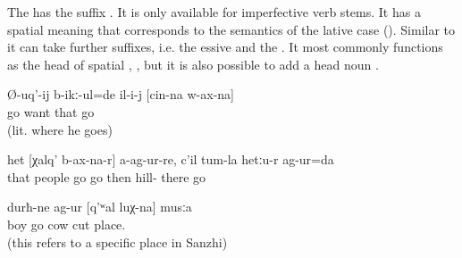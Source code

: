 The  has the suffix . It is only available for imperfective verb stems. It has a spatial meaning that corresponds to the semantics of the lative case (). Similar to  it can take further  suffixes, i.e. the essive and the . It most commonly functions as the head of spatial  , , but it is also possible to add a head noun .
%
\begin{exe}
	\ex	\label{ex:‎He wanted to go his way (where he is going)}
	\gll	Ø-uq'-ij	b-ikː-ul=de	il-i-j	[cin-na	w-ax-na]\\
		go	want	that		go\\
	\glt	{} (lit. where he goes)

	\ex	\label{ex:‎‎I did not go through where the people (normally) go, but through where the hill is}
	\gll	het	[χalq'	b-ax-na-r]	a-ag-ur-re,	c'il	tum-la	hetːu-r	ag-ur=da\\
		that	people	go	go	then	hill-	there	go\\
	\glt	{}

	\ex	\label{ex:‎‎‎The boys went to the place where cows are slaughtered}
	\gll	durħ-ne	ag-ur	[q'ʷal	luχ-na]	musːa\\
		boy	go	cow	cut	place.\\
	\glt	{} (this refers to a specific place in Sanzhi)
\end{exe}

